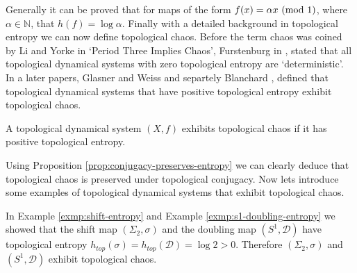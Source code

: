 Generally it can be proved that for maps of the form $f(x) = \alpha x \ (\mathrm{mod}\ 1)$, where $\alpha \in \mathbb{N}$, that $h(f) = \log \alpha$. Finally with a detailed background in topological entropy we can now define topological chaos. Before the term chaos was coined by Li and Yorke in `Period Three Implies Chaos', Furstenburg in \cite{furstenberg}, stated that all topological dynamical systems with zero topological entropy are `deterministic'. In a later papers, Glasner and Weiss \cite{glasner-weiss} and separtely Blanchard \cite{blanchard}, defined that topological dynamical systems that have positive topological entropy exhibit topological chaos.

\begin{defn}
    A topological dynamical system $(X, f)$ exhibits topological chaos if it has positive topological entropy.
\end{defn}

Using Proposition \ref{prop:conjugacy-preserves-entropy} we can clearly deduce that topological chaos is preserved under topological conjugacy. Now lets introduce some examples of topological dynamical systems that exhibit topological chaos.

\begin{exmp}
    In Example \ref{exmp:shift-entropy} and Example \ref{exmp:s1-doubling-entropy} we showed that the shift map $(\Sigma_2, \sigma)$ and the doubling map $(S^1, \mathcal{D})$ have topological entropy $h_{top}(\sigma) = h_{top}(\mathcal{D}) = \log 2 > 0$. Therefore $(\Sigma_2, \sigma)$ and $(S^1, \mathcal{D})$ exhibit topological chaos.
\end{exmp}